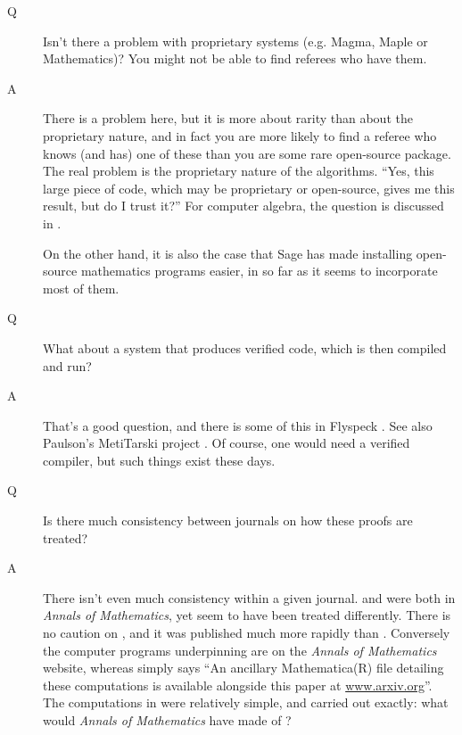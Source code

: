 \begin{description}
\item[Q]Isn't there a problem with proprietary systems (e.g. Magma, Maple or Mathematics)? You might not be able to find referees who have them.
\item[A]There is a problem here, but it is more about rarity than about the proprietary nature, and in fact you are more likely to find a referee who knows (and has) one of these than you are some rare open-source package. The real problem is the proprietary nature of the algorithms. ``Yes, this large piece of code, which may be proprietary or open-source, gives me this result, but do I trust it?''  For computer algebra, the question is discussed in \cite{Davenport2017z}.
\par On the other hand, it is also the case that Sage has made installing open-source mathematics programs easier, in so far as it seems to incorporate most of them. 
\item[Q]What about a system that produces verified code, which is then compiled and run?
\item[A]That's a good question, and there is some of this in Flyspeck \cite{Halesetal2017a}.  See also Paulson's MetiTarski project \cite{AkbarpourPaulson2010}.
Of course, one would need a verified compiler, but such things exist these days.
\item[Q]Is there much consistency between journals on how these proofs are treated?
\item[A]There isn't even much consistency within a given journal. \cite{Hales2005} and \cite{Maynard2015a} were both in \emph{Annals of Mathematics}, yet seem to have been treated differently. There is no caution on \cite{Maynard2015a}, and it was published much more rapidly than  \cite{Hales2005}. Conversely the computer programs underpinning \cite{Hales2005} are on the \emph{Annals of Mathematics} website, whereas \cite{Maynard2015a} simply says ``An ancillary Mathematica(R) file detailing these computations is available alongside this
paper at \url{ www.arxiv.org}''. The computations in \cite{Maynard2015a} were relatively simple, and carried out exactly: what would \emph{Annals of Mathematics} have made of \cite{Maynard2013a}?
\end{description}
